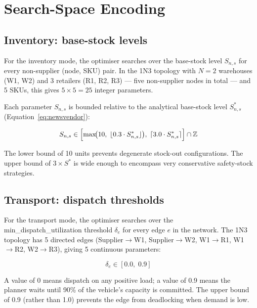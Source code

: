 \section{Search-Space Encoding}
\label{sec:opt:space}

\subsection{Inventory: base-stock levels}
\label{sec:opt:space-inventory}

For the inventory mode, the optimiser searches over the base-stock level
$S_{n,s}$ for every non-supplier (node, SKU) pair.  In the 1N3 topology
with $N=2$ warehouses (W1, W2) and 3 retailers (R1, R2, R3) — five
non-supplier nodes in total — and 5 SKUs, this gives $5 \times 5 = 25$
integer parameters.

Each parameter $S_{n,s}$ is bounded relative to the analytical base-stock
level $S^*_{n,s}$ (Equation~\ref{eq:newsvendor}):

\begin{equation}
  S_{n,s} \in \Bigl[\max\!\bigl(10,\; \lfloor 0.3 \cdot S^*_{n,s} \rfloor\bigr),\;
                    \lceil 3.0 \cdot S^*_{n,s} \rceil\Bigr] \cap \mathbb{Z}
  \label{eq:inv-bounds}
\end{equation}

The lower bound of 10 units prevents degenerate stock-out configurations.
The upper bound of $3 \times S^*$ is wide enough to encompass very
conservative safety-stock strategies.

\subsection{Transport: dispatch thresholds}
\label{sec:opt:space-transport}

For the transport mode, the optimiser searches over the
min\_dispatch\_utilization threshold $\delta_e$ for every edge $e$
in the network.  The 1N3 topology has 5 directed edges
(Supplier$\to$W1, Supplier$\to$W2, W1$\to$R1, W1$\to$R2, W2$\to$R3),
giving 5 continuous parameters:

\begin{equation}
  \delta_e \in [0.0,\; 0.9]
  \label{eq:disp-bounds}
\end{equation}

A value of 0 means dispatch on any positive load; a value of 0.9 means
the planner waits until 90\% of the vehicle's capacity is committed.
The upper bound of 0.9 (rather than 1.0) prevents the edge from
deadlocking when demand is low.

